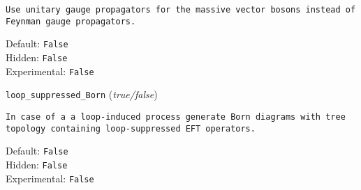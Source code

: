 \begin{basedescript}{\desclabelstyle{\pushlabel}}
\begin{verbatim}
Use unitary gauge propagators for the massive vector bosons instead of
Feynman gauge propagators.
\end{verbatim}
Default: \verb|False|
\\Hidden: \verb|False|
\\Experimental: \verb|False|
\\\item[\colorbox{gray!30}{\texttt{loop\_suppressed\_Born}}] (\textit{true/false})
\begin{verbatim}
In case of a a loop-induced process generate Born diagrams with tree
topology containing loop-suppressed EFT operators.
\end{verbatim}
Default: \verb|False|
\\Hidden: \verb|False|
\\Experimental: \verb|False|
\\\end{basedescript}
